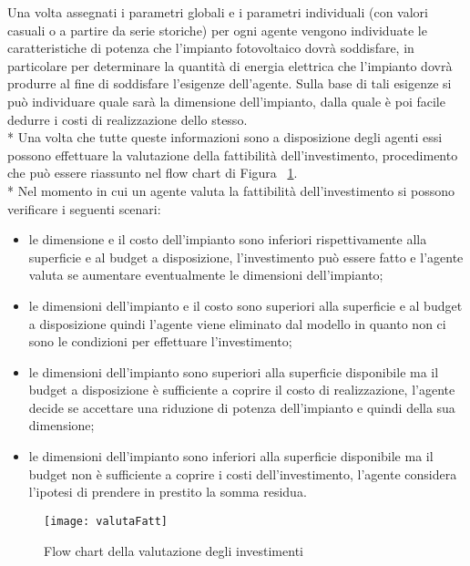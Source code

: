 \documentclass[12pt,a4paper,openright,twoside]{report}
\begin{document}
Una volta assegnati i parametri globali e i parametri individuali (con valori casuali o a partire da serie storiche) per ogni agente vengono individuate le caratteristiche di potenza che l'impianto fotovoltaico dovrà soddisfare, in particolare per determinare la quantità di energia elettrica che l'impianto dovrà produrre al fine di soddisfare l'esigenze dell'agente. Sulla base di tali esigenze si può individuare quale sarà la dimensione dell'impianto, dalla quale è poi facile dedurre i costi di realizzazione dello stesso.\\*
Una volta che tutte queste informazioni sono a disposizione degli agenti essi possono effettuare la valutazione della fattibilità dell'investimento, procedimento che può essere riassunto nel flow chart  di Figura ~\ref{flowChartValFatt}.
\\*
Nel  momento in cui un agente valuta la fattibilità dell'investimento si possono verificare i seguenti scenari:
\begin{itemize}
\item le dimensione e il costo dell'impianto sono inferiori rispettivamente  alla superficie e al budget a disposizione, l'investimento può essere fatto e l'agente valuta se aumentare eventualmente le dimensioni dell'impianto;
\item le dimensioni dell'impianto e il costo sono superiori alla superficie e al budget a disposizione quindi l'agente viene eliminato dal modello in quanto non ci sono le condizioni per effettuare l'investimento;
\item le dimensioni dell'impianto sono superiori alla superficie disponibile ma il budget a disposizione è sufficiente a coprire il costo di realizzazione, l'agente decide se accettare una riduzione di potenza dell'impianto e quindi della sua dimensione;
\item le dimensioni dell'impianto sono inferiori alla superficie disponibile ma il budget non è sufficiente a coprire i costi dell'investimento, l'agente considera l'ipotesi di prendere in prestito la somma residua.
\end{itemize}

\begin{figure}[hbt]
	\centering
	\texttt{[image: valutaFatt]}
	\caption{Flow chart della valutazione degli investimenti}
	\label{flowChartValFatt}
\end{figure}
\end{document}
